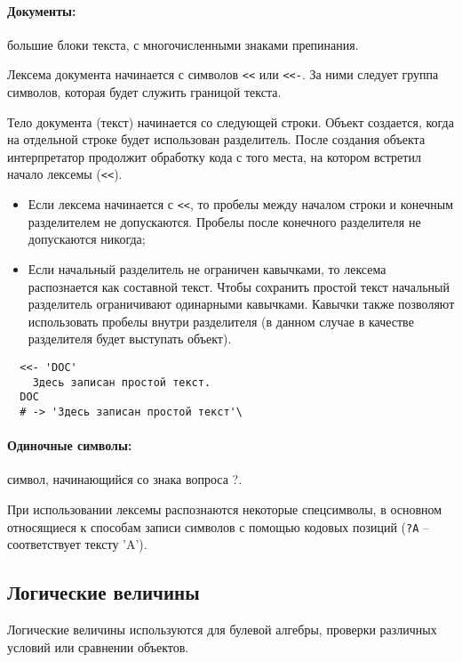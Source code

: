 \paragraph*{Документы:} большие блоки текста, с многочисленными знаками препинания. 

Лексема документа начинается с символов \verb!<<! или \verb!<<-!. За ними следует группа символов, которая будет служить границой текста. 

Тело документа (текст) начинается со следующей строки. Объект создается, когда на отдельной строке будет использован разделитель. После создания объекта интерпретатор продолжит обработку кода с того места, на котором встретил начало лексемы (\verb!<<!). 

\begin{itemize}
  \item Если лексема начинается с \verb!<<!, то пробелы между началом строки и конечным разделителем не допускаются. Пробелы после конечного разделителя не допускаются никогда;

  \item Если начальный разделитель не ограничен кавычками, то лексема распознается как составной текст. Чтобы сохранить простой текст начальный разделитель ограничивают одинарными кавычками. Кавычки также позволяют использовать пробелы внутри разделителя (в данном случае в качестве разделителя будет выступать объект).
\end{itemize}
\begin{verbatim}
  <<- 'DOC'
    Здесь записан простой текст.
  DOC
  # -> 'Здесь записан простой текст'\
\end{verbatim}

\paragraph*{Одиночные символы:} символ, начинающийся со знака вопроса ?.

При использовании лексемы распознаются некоторые спецсимволы, в основном относящиеся к способам записи символов с помощью кодовых позиций (\verb!?A! – соответствует тексту 'A').

\subsection{Логические величины}

Логические величины используются для булевой алгебры, проверки различных условий или сравнении объектов.

